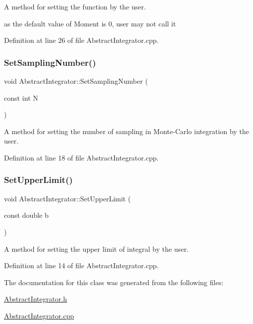 A method for setting the function by the user. 

as the default value of Moment is 0, user may not call it 

Definition at line 26 of file Abstract\+Integrator.\+cpp.

\mbox{\label{class_abstract_integrator_a48c0b007c4b18e4a229f014bb0ccf9c0}} 
\subsubsection{\texorpdfstring{Set\+Sampling\+Number()}{SetSamplingNumber()}}
{\footnotesize\ttfamily void Abstract\+Integrator\+::\+Set\+Sampling\+Number (\begin{DoxyParamCaption}\item[{const int}]{N }\end{DoxyParamCaption})}



A method for setting the number of sampling in Monte-\/\+Carlo integration by the user. 



Definition at line 18 of file Abstract\+Integrator.\+cpp.

\mbox{\label{class_abstract_integrator_a341070bf2dca9e2ac113d388e6d06556}} 
\subsubsection{\texorpdfstring{Set\+Upper\+Limit()}{SetUpperLimit()}}
{\footnotesize\ttfamily void Abstract\+Integrator\+::\+Set\+Upper\+Limit (\begin{DoxyParamCaption}\item[{const double}]{b }\end{DoxyParamCaption})}



A method for setting the upper limit of integral by the user. 



Definition at line 14 of file Abstract\+Integrator.\+cpp.



The documentation for this class was generated from the following files\+:\begin{DoxyCompactItemize}
\item 
\hyperlink{_abstract_integrator_8h}{Abstract\+Integrator.\+h}\item 
\hyperlink{_abstract_integrator_8cpp}{Abstract\+Integrator.\+cpp}\end{DoxyCompactItemize}
